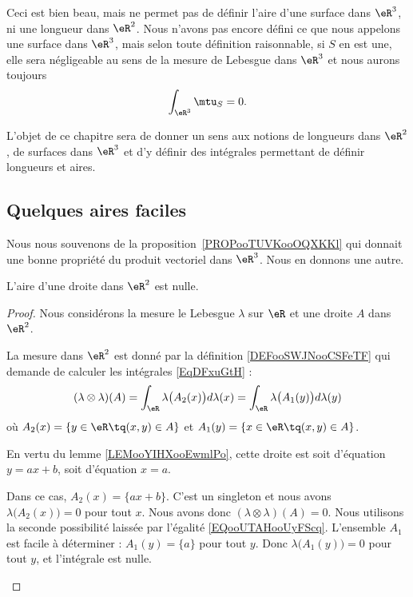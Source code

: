 Ceci est bien beau, mais ne permet pas de définir l'aire d'une surface dans \( \eR^3\), ni une longueur dans \( \eR^2\). Nous n'avons pas encore défini ce que nous appelons une surface dans \( \eR^3\), mais selon toute définition raisonnable, si \( S\) en est une, elle sera négligeable au sens de la mesure de Lebesgue dans \( \eR^3\) et nous aurons toujours
\begin{equation}
	\int_{\eR^3}\mtu_S=0.
\end{equation}

L'objet de ce chapitre sera de donner un sens aux notions de longueurs dans \( \eR^2\), de surfaces dans \( \eR^3\) et d'y définir des intégrales permettant de définir longueurs et aires.

\subsection{Quelques aires faciles}

Nous nous souvenons de la proposition~\ref{PROPooTUVKooOQXKKl} qui donnait une bonne propriété du produit vectoriel dans \( \eR^3\). Nous en donnons une autre.

\begin{lemma}       \label{LEMooVHGKooDjcfOL}
	L'aire d'une droite dans \( \eR^2\) est nulle.
\end{lemma}

\begin{proof}
	Nous considérons la mesure le Lebesgue \( \lambda\) sur \( \eR\) et une droite \( A\) dans \( \eR^2\).

	La mesure dans \( \eR^2\) est donné par la définition \ref{DEFooSWJNooCSFeTF} qui demande de calculer les intégrales \eqref{EqDFxuGtH} :
	\begin{equation}        \label{EQooUTAHooUyFScq}
		(\lambda\otimes \lambda)(A)=\int_{\eR}\lambda\big( A_2(x) \big)d\lambda(x)=\int_{\eR}\lambda\big( A_1(y) \big)d\lambda(y)
	\end{equation}
	où \( A_2(x)=\{ y\in \eR\tq (x,y)\in A \}\) et \( A_1(y)=\{ x\in \eR\tq (x,y)\in A \}\).

	En vertu du lemme \ref{LEMooYIHXooEwmlPo}, cette droite est soit d'équation \( y=ax+b\), soit d'équation \( x=a\).
	\begin{subproof}
		\spitem[Droite \( y=ax+b\)]
		Dans ce cas, \( A_2(x)=\{ ax+b \}\). C'est un singleton et nous avons \( \lambda\big( A_2(x) \big)=0\) pour tout \( x\). Nous avons donc \( (\lambda\otimes \lambda)(A)=0\).
		\spitem[Droite \( x=a\)]
		Nous utilisons la seconde possibilité laissée par l'égalité \eqref{EQooUTAHooUyFScq}. L'ensemble \( A_1\) est facile à déterminer :  \( A_1(y)=\{ a \}\) pour tout \( y\). Donc \( \lambda\big( A_1(y) \big)=0\) pour tout \( y\), et l'intégrale est nulle.
	\end{subproof}
\end{proof}

